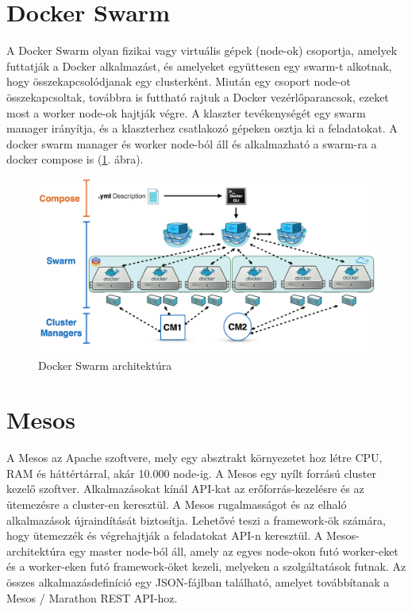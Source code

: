 \section{Docker Swarm}
A Docker Swarm olyan fizikai vagy virtuális gépek (node-ok) csoportja, amelyek futtatják a Docker alkalmazást, és amelyeket együttesen egy swarm-t alkotnak, hogy összekapcsolódjanak egy clusterként. Miután egy csoport node-ot összekapcsoltak, továbbra is futtható rajtuk a Docker vezérlőparancsok, ezeket most a worker node-ok hajtják végre. A klaszter tevékenységét egy swarm manager irányítja, és a klaszterhez csatlakozó gépeken osztja ki a feladatokat. A docker swarm manager és worker node-ból áll és alkalmazható a swarm-ra a docker compose is (\ref{fig:swarm}. ábra).
\begin{figure}
	\centering
	\includegraphics[width=\linewidth]{figures/swarm.png}
	\caption{Docker Swarm architektúra \cite{docker-swarm}}
	\label{fig:swarm}
\end{figure}

\section{Mesos}
A Mesos az Apache szoftvere, mely egy absztrakt környezetet hoz létre CPU, RAM és háttértárral, akár 10.000 node-ig. A Mesos egy nyílt forrású cluster kezelő szoftver. Alkalmazásokat kínál API-kat az erőforrás-kezelésre és az ütemezésre a cluster-en keresztül.  A Mesos rugalmasságot és az elhaló alkalmazások újraindítását biztosítja. Lehetővé teszi a framework-ök számára, hogy ütemezzék és végrehajtják a feladatokat API-n keresztül. A Mesos-architektúra egy master node-ból áll, amely az egyes node-okon futó worker-eket és a worker-eken futó framework-öket kezeli, melyeken a szolgáltatások futnak. Az összes alkalmazásdefiníció egy JSON-fájlban található, amelyet továbbítanak a Mesos / Marathon REST API-hoz.

